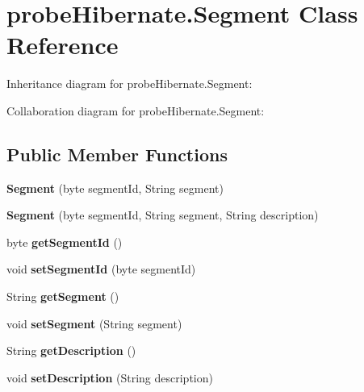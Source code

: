 \hypertarget{classprobe_hibernate_1_1_segment}{}\section{probe\+Hibernate.\+Segment Class Reference}
\label{classprobe_hibernate_1_1_segment}


Inheritance diagram for probe\+Hibernate.\+Segment\+:


Collaboration diagram for probe\+Hibernate.\+Segment\+:
\subsection*{Public Member Functions}
\begin{DoxyCompactItemize}
\item 
\mbox{\label{classprobe_hibernate_1_1_segment_a21060955087d98daa256917a001c3b1b}} 
{\bfseries Segment} (byte segment\+Id, String segment)
\item 
\mbox{\label{classprobe_hibernate_1_1_segment_a4abca28f0a051da2ec05a4b9c03e698b}} 
{\bfseries Segment} (byte segment\+Id, String segment, String description)
\item 
\mbox{\label{classprobe_hibernate_1_1_segment_ac12589ed37072019e371d5f12b38e346}} 
byte {\bfseries get\+Segment\+Id} ()
\item 
\mbox{\label{classprobe_hibernate_1_1_segment_a42e9f8669d209f0feb6a2ac18a287f8c}} 
void {\bfseries set\+Segment\+Id} (byte segment\+Id)
\item 
\mbox{\label{classprobe_hibernate_1_1_segment_a2a8212612bea70935bde6ad7ae924918}} 
String {\bfseries get\+Segment} ()
\item 
\mbox{\label{classprobe_hibernate_1_1_segment_a469b8d70c4c23aa1da400ce3eaa2dead}} 
void {\bfseries set\+Segment} (String segment)
\item 
\mbox{\label{classprobe_hibernate_1_1_segment_a6f59a367b39ae1d1216d183ca06da777}} 
String {\bfseries get\+Description} ()
\item 
\mbox{\label{classprobe_hibernate_1_1_segment_a9b818c879ff27edbc2112cee54ff4537}} 
void {\bfseries set\+Description} (String description)
\end{DoxyCompactItemize}


